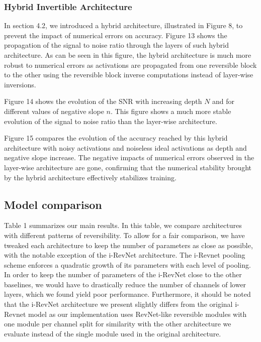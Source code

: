 \documentclass[twocolumn]{bmcart}
\begin{document}
\subsubsection{Hybrid Invertible Architecture}

In section 4.2, we introduced a hybrid architecture,
illustrated in Figure 8, to prevent the impact of numerical errors on accuracy.
Figure 13 shows the propagation of the signal to noise ratio through the layers of such hybrid architecture.
As can be seen in this figure, the hybrid architecture is much more robust to numerical errors as activations
are propagated from one reversible block to the other using the reversible block inverse computations instead of layer-wise inversions.

Figure 14 shows the evolution of the SNR with increasing depth $N$ and for different values of negative slope $n$.
This figure shows a much more stable evolution of the signal to noise ratio than the layer-wise architecture.

Figure 15 compares the evolution of the accuracy reached by this hybrid architecture with noisy activations and noiseless ideal activations as depth and negative slope increase.
The negative impacts of numerical errors observed in the layer-wise architecture are gone,
confirming that the numerical stability brought by the hybrid architecture effectively stabilizes training.


\subsection{Model comparison}

Table 1 summarizes our main results.
In this table, we compare architectures with different patterns of reversibility.
To allow for a fair comparison, we have tweaked each architecture to keep the number of parameters as close as possible,
with the notable exception of the i-RevNet architecture.
The i-Revnet pooling scheme enforces a quadratic growth of its parameters with each level of pooling.
In order to keep the number of parameters of the i-RevNet close to the other baselines, we would have to drastically
reduce the number of channels of lower layers, which we found yield poor performance.
Furthermore, it should be noted that the i-RevNet architecture we present slightly differs from the original i-Revnet model
as our implementation uses RevNet-like reversible modules with one module per channel split for similarity with
the other architecture we evaluate instead of the single module used in the original architecture.
\end{document}
